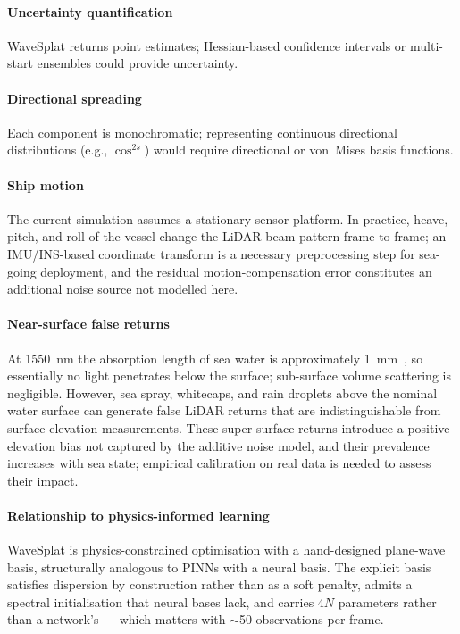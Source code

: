 \documentclass[review]{elsarticle}
\begin{document}
\paragraph{Uncertainty quantification}
WaveSplat returns point estimates;
Hessian-based confidence intervals or multi-start ensembles could
provide uncertainty.

\paragraph{Directional spreading}
Each component is monochromatic;
representing continuous directional distributions (e.g., $\cos^{2s}$)
would require directional or von~Mises basis functions.

\paragraph{Ship motion}
The current simulation assumes a stationary
sensor platform.  In practice, heave, pitch, and roll of the vessel
change the LiDAR beam pattern frame-to-frame; an IMU/INS-based
coordinate transform is a necessary preprocessing step for
sea-going deployment, and the residual motion-compensation error
constitutes an additional noise source not modelled here.

\paragraph{Near-surface false returns}
At 1550~nm the absorption length
of sea water is approximately 1~mm~\citep{hale1973}, so essentially
no light penetrates below the surface; sub-surface volume scattering
is negligible.  However, sea spray, whitecaps, and rain droplets
above the nominal water surface can generate false LiDAR returns
that are indistinguishable from surface elevation measurements.
These super-surface returns introduce a positive elevation bias
not captured by the additive noise model, and their prevalence
increases with sea state; empirical calibration on real data is
needed to assess their impact.

\paragraph{Relationship to physics-informed learning}
WaveSplat is physics-constrained optimisation with a hand-designed plane-wave basis,
structurally analogous to PINNs with a neural basis. The explicit basis satisfies
dispersion by construction rather than as a soft penalty, admits a spectral
initialisation that neural bases lack, and carries $4N$ parameters rather than a
network's --- which matters with $\sim$50 observations per frame.
\end{document}
